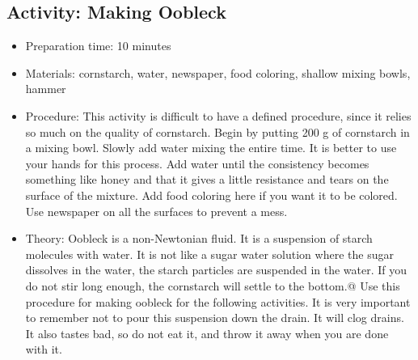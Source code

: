 \begin{itemize}
{\begin{itemize}
\subsection{Activity: Making Oobleck}
\begin{itemize}
\item{Preparation time: 10 minutes}
\item{Materials: cornstarch, water, newspaper, food coloring, shallow mixing bowls, hammer}
\item{Procedure: This activity is difficult to have a defined procedure, since it relies so much on the quality of cornstarch. Begin by putting 200 g of cornstarch in a mixing bowl. Slowly add water mixing the entire time. It is better to use your hands for this process. Add water until the consistency becomes something like honey and that it gives a little resistance and tears on the surface of the mixture. Add food coloring here if you want it to be colored. Use newspaper on all the surfaces to prevent a mess.}
\item{Theory: Oobleck is a non-Newtonian fluid. It is a suspension of starch molecules with water. It is not like a sugar water solution where the sugar dissolves in the water, the starch particles are suspended in the water. If you do not stir long enough, the cornstarch will settle to the bottom.@	Use this procedure for making oobleck for the following activities. It is very important to remember not to pour this suspension down the drain. It will clog drains. It also tastes bad, so do not eat it, and throw it away when you are done with it.}
\end{itemize}


\end{itemize}}
\end{itemize}
